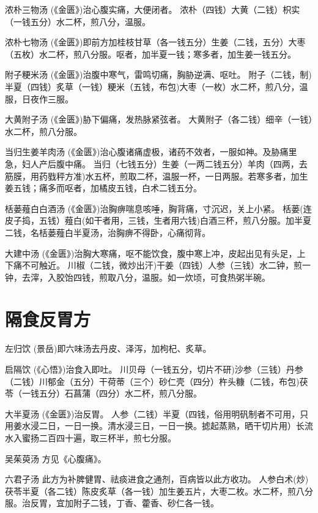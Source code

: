 \documentclass[a4paper,12pt,UTF8,twoside]{ctexbook}
\begin{document}
    浓朴三物汤
    (《金匮》)治心腹实痛，大便闭者。
    浓朴（四钱）大黄（二钱）枳实（一钱五分）水二杯，煎八分，温服。
    
    浓朴七物汤
    (《金匮》)即前方加桂枝甘草（各一钱五分）生姜（二钱，五分）大枣（五枚）水二杯，煎八分服。呕者，加半夏一钱；寒多者，加生姜一钱五分。
    
    附子粳米汤
    (《金匮》)治腹中寒气，雷鸣切痛，胸胁逆满、呕吐。
    附子（二钱，制)半夏（四钱）炙草（一钱）粳米（五钱，布包)大枣（一枚）水二杯，煎八分，温服，日夜作三服。
    
    大黄附子汤
    (《金匮》)胁下偏痛，发热脉紧弦者。
    大黄附子（各二钱）细辛（一钱）水二杯，煎八分服。
    
    当归生姜羊肉汤
    (《金匮》)治心腹诸痛虚极，诸药不效者，一服如神。及胁痛里急，妇人产后腹中痛。
    当归（七钱五分）生姜（一两二钱五分）羊肉（四两，去筋膜，用药戥秤方准)水五杯，煎取二杯，温服一杯，一日两服。若寒多者，加生姜五钱；痛多而呕者，加橘皮五钱，白术二钱五分。
    
    栝蒌薤白白酒汤
    (《金匮》)治胸痹喘息咳唾，胸背痛，寸沉迟，关上小紧。
    栝蒌(连皮子捣，五钱）薤白(如干者用，三钱，生者用六钱)白酒三杯，煎八分服。加半夏二钱，名栝蒌薤白半夏汤，治胸痹不得卧，心痛彻背。
    
    大建中汤
    (《金匮》)治胸大寒痛，呕不能饮食，腹中寒上冲，皮起出见有头足，上下痛不可触近。
    川椒（二钱，微炒出汗)干姜（四钱）人参（三钱）水二钟，煎一钟，去滓，入胶饴四钱，煎取八分，温服。如一炊顷，可食热粥半碗。   
    
    
    \section{隔食反胃方}	
    
    左归饮
    (景岳)即六味汤去丹皮、泽泻，加枸杞、炙草。
    
    启隔饮
    (《心悟》)治食入即吐。
    川贝母（一钱五分，切片不研)沙参（三钱）丹参（二钱）川郁金（五分）干荷蒂（三个）砂仁壳（四分）杵头糠（二钱，布包)茯苓（一钱五分）石菖蒲（四分）水二杯，煎八分服。
    
    大半夏汤
    (《金匮》)治反胃。
    人参（二钱）半夏（四钱，俗用明矾制者不可用，只用姜水浸二日，一日一换。清水浸三日，一日一换。摅起蒸熟，晒干切片用）长流水入蜜扬二百四十遍，取三杯半，煎七分服。
    
    吴茱萸汤
    方见《心腹痛》。
    
    六君子汤
    此方为补脾健胃、祛痰进食之通剂，百病皆以此方收功。
    人参白术(炒)茯苓半夏（各二钱）陈皮炙草（各一钱）加生姜五片，大枣二枚。水二杯，煎八分服。治反胃，宜加附子二钱，丁香、藿香、砂仁各一钱。
    
\end{document}
